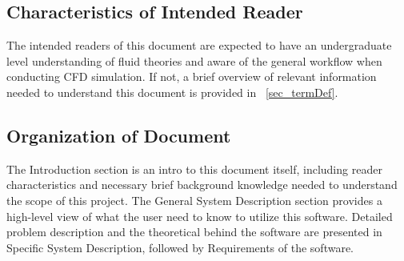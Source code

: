 \documentclass[12pt]{article}
\begin{document}
\subsection{Characteristics of Intended Reader} \label{sec_IntendedReader}

The intended readers of this document are expected to have an undergraduate level understanding of fluid theories and aware of the general workflow when conducting CFD simulation. If not, a brief overview of relevant information needed to understand this document is provided in ~\ref{sec_termDef}.



\subsection{Organization of Document}
The Introduction section is an intro to this document itself, including reader characteristics and necessary brief background knowledge needed to understand the scope of this project. The General System Description section provides a high-level view of what the user need to know to utilize this software. Detailed problem description and the theoretical behind the software are presented in Specific System Description, followed by Requirements of the software.

\end{document}
